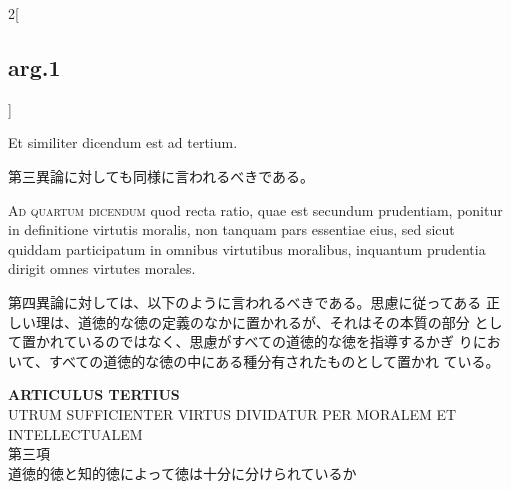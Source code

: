 \documentclass[paper=a4paper,fontsize=10pt,jafontsize=9pt,titlepage]{jlreq}
\begin{document}
\begin{paracol}{2}[\subsection{arg.1}]
\switchcolumn*[\subsection{ad.3}]

Et similiter dicendum est ad tertium.

\switchcolumn

第三異論に対しても同様に言われるべきである。

\switchcolumn*[\subsection{ad.4}]

{\scshape Ad quartum dicendum} quod recta ratio, quae est secundum
prudentiam, ponitur in definitione virtutis moralis, non tanquam pars
essentiae eius, sed sicut quiddam participatum in omnibus virtutibus
moralibus, inquantum prudentia dirigit omnes virtutes morales.

\switchcolumn

第四異論に対しては、以下のように言われるべきである。思慮に従ってある
 正しい理は、道徳的な徳の定義のなかに置かれるが、それはその本質の部分
 として置かれているのではなく、思慮がすべての道徳的な徳を指導するかぎ
 りにおいて、すべての道徳的な徳の中にある種分有されたものとして置かれ
 ている。

\end{paracol}
\newpage
{}
{}
\setcounter{section}{3}
\setcounter{subsection}{0}



\begin{center}
{\Large {\bfseries ARTICULUS TERTIUS}}\\
{\large UTRUM SUFFICIENTER VIRTUS DIVIDATUR PER MORALEM ET INTELLECTUALEM}\\
{\Large 第三項\\道徳的徳と知的徳によって徳は十分に分けられているか}
\end{center}
\end{document}
